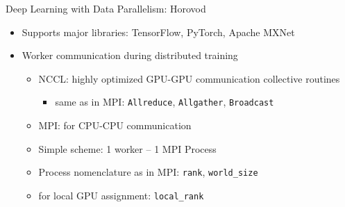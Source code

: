 \begin{frame}{Deep Learning with Data Parallelism: Horovod}
\protect\hypertarget{deep-learning-with-data-parallelism-horovod-1}{}

\begin{itemize}
\tightlist
\item
  Supports major libraries: TensorFlow, PyTorch, Apache MXNet
\item
  Worker communication during distributed training

  \begin{itemize}
  \tightlist
  \item
    NCCL: highly optimized GPU-GPU communication collective routines

    \begin{itemize}
    \tightlist
    \item
      same as in MPI: \texttt{Allreduce}, \texttt{Allgather},
      \texttt{Broadcast}
    \end{itemize}
  \item
    MPI: for CPU-CPU communication
  \item
    Simple scheme: 1 worker -- 1 MPI Process
  \item
    Process nomenclature as in MPI: \texttt{rank}, \texttt{world\_size}
  \item
    for local GPU assignment: \texttt{local\_rank}
  \end{itemize}
\end{itemize}


\end{frame}

